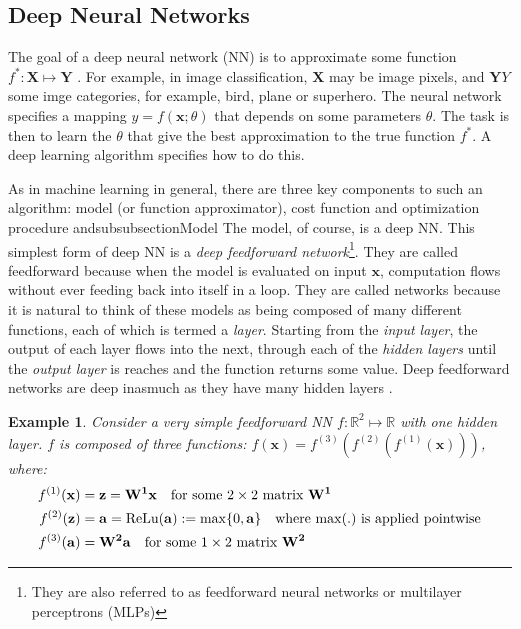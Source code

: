 \documentclass[11pt, a4paper, bibliography=totoc]{report}
\newcommand{\reals}{\mathbb{R}}
\newcommand{\x}{\mathbf{x}}
\newtheorem{example}{Example}
\begin{document}
\subsection{Deep Neural Networks} \label{sec:dnn}
The goal of a deep neural network (NN) is to approximate some function $ f^* : \textbf{X} \mapsto \textbf{Y} $ \cite{Goodfellow-et-al-2016}. For example, in image classification, $ \textbf{X} $ may be image pixels, and $ \textbf{Y}Y $ some imge categories, for example, bird, plane or superhero. The neural network specifies a mapping $ y = f(\x ; \theta) $ that depends on some parameters $ \theta $. The task is then to learn the $ \theta $ that give the best approximation to the true function $ f^* $. A deep learning algorithm specifies how to do this.

As in machine learning in general, there are three key components to such an algorithm: model (or function approximator), cost function and optimization procedure andsubsubsection{Model}
The model, of course, is a deep NN. This simplest form of deep NN is a \textit{deep feedforward network}\footnote{They are also referred to as feedforward neural networks or multilayer perceptrons (MLPs)}. They are called feedforward because when the model is evaluated on input $ \x $, computation flows without ever feeding back into itself in a loop. They are called networks because it is natural to think of these models as being composed of many different functions, each of which is termed a \textit{layer}. Starting from the \textit{input layer}, the output of each layer flows into the next, through each of the \textit{hidden layers} until the \textit{output layer} is reaches and the function returns some value. Deep feedforward networks are deep inasmuch as they have many hidden layers \cite[p.~164]{Goodfellow-et-al-2016}.

\begin{example} \label{eg:nn}
Consider a very simple feedforward NN $ f : \reals^2 \mapsto \reals $ with one hidden layer. $ f $ is composed of three functions: $ f(\x) = f^{(3)}(f^{(2)}(f^{(1)}(\x))) $, where:
\begin{align*}
	f^{(1)}(\x) &= \mathbf{z} = \mathbf{W^1}\x \quad \text{for some $ 2\times 2 $ matrix $ \mathbf{W^1} $} \\
	f^{(2)}(\mathbf{z}) &= \mathbf{a} = \textup{ReLu}(\mathbf{a}) := \max\{0,\mathbf{a} \} \quad \text{where $ \max(.) $ is applied pointwise} \\
	f^{(3)}(\mathbf{a}) &= \mathbf{W^2}\mathbf{a} \quad \text{for some $ 1 \times 2 $ matrix $ \mathbf{W^2} $}
\end{align*}
\end{example}
\end{document}
